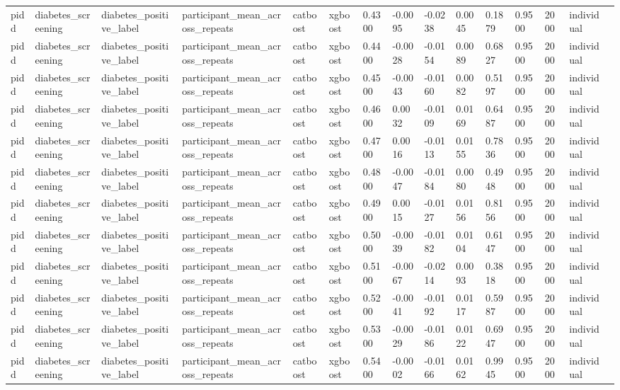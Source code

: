 \begin{tabular}{lllllllllllllll}
pidd & diabetes\_screening & diabetes\_positive\_label & participant\_mean\_across\_repeats & catboost & xgboost & 0.4300 & -0.0095 & -0.0238 & 0.0045 & 0.1879 & 0.9500 & 2000 & individual &  \\
pidd & diabetes\_screening & diabetes\_positive\_label & participant\_mean\_across\_repeats & catboost & xgboost & 0.4400 & -0.0028 & -0.0154 & 0.0089 & 0.6827 & 0.9500 & 2000 & individual &  \\
pidd & diabetes\_screening & diabetes\_positive\_label & participant\_mean\_across\_repeats & catboost & xgboost & 0.4500 & -0.0043 & -0.0160 & 0.0082 & 0.5197 & 0.9500 & 2000 & individual &  \\
pidd & diabetes\_screening & diabetes\_positive\_label & participant\_mean\_across\_repeats & catboost & xgboost & 0.4600 & 0.0032 & -0.0109 & 0.0169 & 0.6487 & 0.9500 & 2000 & individual &  \\
pidd & diabetes\_screening & diabetes\_positive\_label & participant\_mean\_across\_repeats & catboost & xgboost & 0.4700 & 0.0016 & -0.0113 & 0.0155 & 0.7836 & 0.9500 & 2000 & individual &  \\
pidd & diabetes\_screening & diabetes\_positive\_label & participant\_mean\_across\_repeats & catboost & xgboost & 0.4800 & -0.0047 & -0.0184 & 0.0080 & 0.4948 & 0.9500 & 2000 & individual &  \\
pidd & diabetes\_screening & diabetes\_positive\_label & participant\_mean\_across\_repeats & catboost & xgboost & 0.4900 & 0.0015 & -0.0127 & 0.0156 & 0.8156 & 0.9500 & 2000 & individual &  \\
pidd & diabetes\_screening & diabetes\_positive\_label & participant\_mean\_across\_repeats & catboost & xgboost & 0.5000 & -0.0039 & -0.0182 & 0.0104 & 0.6147 & 0.9500 & 2000 & individual &  \\
pidd & diabetes\_screening & diabetes\_positive\_label & participant\_mean\_across\_repeats & catboost & xgboost & 0.5100 & -0.0067 & -0.0214 & 0.0093 & 0.3818 & 0.9500 & 2000 & individual &  \\
pidd & diabetes\_screening & diabetes\_positive\_label & participant\_mean\_across\_repeats & catboost & xgboost & 0.5200 & -0.0041 & -0.0192 & 0.0117 & 0.5987 & 0.9500 & 2000 & individual &  \\
pidd & diabetes\_screening & diabetes\_positive\_label & participant\_mean\_across\_repeats & catboost & xgboost & 0.5300 & -0.0029 & -0.0186 & 0.0122 & 0.6947 & 0.9500 & 2000 & individual &  \\
pidd & diabetes\_screening & diabetes\_positive\_label & participant\_mean\_across\_repeats & catboost & xgboost & 0.5400 & -0.0002 & -0.0166 & 0.0162 & 0.9945 & 0.9500 & 2000 & individual &  \\

\end{tabular}
